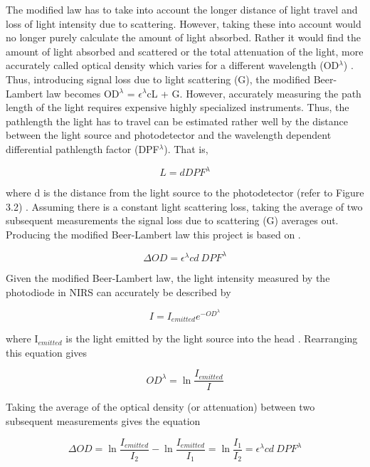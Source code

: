 The modified law has to take into account the longer distance of light travel and loss of light intensity due to scattering. However, taking these into account would no longer purely calculate the amount of light absorbed. Rather it would find the amount of light absorbed and scattered or the total attenuation of the light, more accurately called optical density which varies for a different wavelength (OD$^\lambda$) \cite{rosen05}. Thus, introducing signal loss due to light scattering (G), the modified Beer-Lambert law becomes OD$^\lambda$ = $\epsilon^\lambda$cL + G. However, accurately measuring the path length of the light requires expensive highly specialized instruments. Thus, the pathlength the light has to travel can be estimated rather well by the distance between the light source and photodetector and the wavelength dependent differential pathlength factor (DPF$^\lambda$). That is,

\begin{equation}
L = d DPF^\lambda
\end{equation}
 
where d is the distance from the light source to the photodetector (refer to Figure 3.2) \cite{rosen05}. Assuming there is a constant light scattering loss, taking the average of two subsequent measurements the signal loss due to scattering (G) averages out. Producing the modified Beer-Lambert law this project is based on \cite{chance97}.

\begin{equation}
\Delta OD = \epsilon^\lambda c d\ DPF^\lambda
\end{equation}

Given the modified Beer-Lambert law, the light intensity measured by the photodiode in NIRS can accurately be described by 

\begin{equation}
I = I_{emitted} e^{-OD^\lambda}
\end{equation}

where I$_{emitted}$ is the light emitted by the light source into the head \cite{wolf05,rosen05}. Rearranging this equation gives

\begin{equation}
OD^\lambda = \ln \frac{I_{emitted}}{I}
\end{equation}

Taking the average of the optical density (or attenuation) between two subsequent measurements gives the equation

\begin{equation}
\Delta OD =  \ln \frac{I_{emitted}}{I_2} -  \ln \frac{I_{emitted}}{I_1} = \ln \frac{I_1}{I_2} = \epsilon^\lambda c d\ DPF^\lambda
\end{equation}

